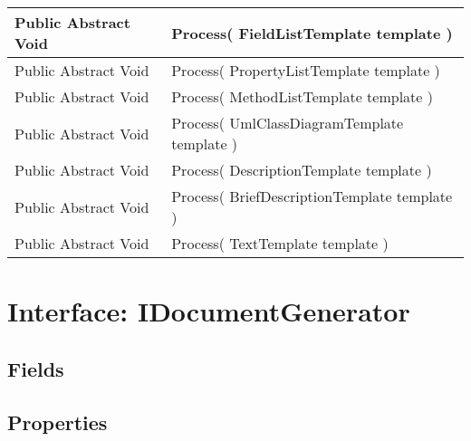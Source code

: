 \documentclass[11pt, oneside, a4paper]{book}
\begin{document}
\begin{center}
\begin{tabular}{| p{3cm} | p{12cm} | }
\hline
 Public  Abstract  Void &  Process(\hypertarget{SoftwareEngineeringTools.{}Documentation.{}IApiDocTemplateProcessor.{}Process\_FieldListTemplate}{} FieldListTemplate  template  )\\
\hline
 Public  Abstract  Void &  Process(\hypertarget{SoftwareEngineeringTools.{}Documentation.{}IApiDocTemplateProcessor.{}Process\_PropertyListTemplate}{} PropertyListTemplate  template  )\\
\hline
 Public  Abstract  Void &  Process(\hypertarget{SoftwareEngineeringTools.{}Documentation.{}IApiDocTemplateProcessor.{}Process\_MethodListTemplate}{} MethodListTemplate  template  )\\
\hline
 Public  Abstract  Void &  Process(\hypertarget{SoftwareEngineeringTools.{}Documentation.{}IApiDocTemplateProcessor.{}Process\_UmlClassDiagramTemplate}{} UmlClassDiagramTemplate  template  )\\
\hline
 Public  Abstract  Void &  Process(\hypertarget{SoftwareEngineeringTools.{}Documentation.{}IApiDocTemplateProcessor.{}Process\_DescriptionTemplate}{} DescriptionTemplate  template  )\\
\hline
 Public  Abstract  Void &  Process(\hypertarget{SoftwareEngineeringTools.{}Documentation.{}IApiDocTemplateProcessor.{}Process\_BriefDescriptionTemplate}{} BriefDescriptionTemplate  template  )\\
\hline
 Public  Abstract  Void &  Process(\hypertarget{SoftwareEngineeringTools.{}Documentation.{}IApiDocTemplateProcessor.{}Process\_TextTemplate}{} TextTemplate  template  )\\
\hline
\end{tabular}
\end{center}
 


\hypertarget{SoftwareEngineeringTools.{}Documentation.{}IDocumentGenerator}{}
\section{Interface: IDocumentGenerator}

\subsection{Fields}

\subsection{Properties}
\end{document}
